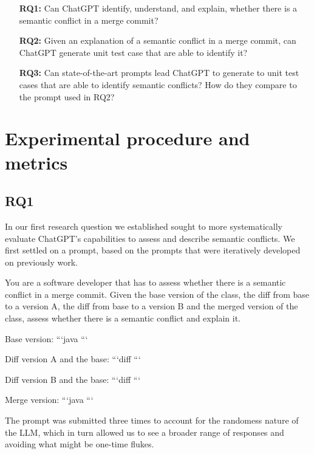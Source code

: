 \begin{itemize}
  \item[\textbf{RQ1:}] Can ChatGPT identify, understand, and explain, whether
  there is a semantic conflict in a merge commit?

  \item[\textbf{RQ2:}] Given an explanation of a semantic conflict in a merge
  commit, can ChatGPT generate unit test case that are able to identify it?

  \item[\textbf{RQ3:}] Can state-of-the-art prompts lead ChatGPT to generate to
  unit test cases that are able to identify semantic conflicts?  How do they
  compare to the prompt used in RQ2?
\end{itemize}

\section{Experimental procedure and metrics}

\subsection{RQ1}

In our first research question we established sought to more systematically evaluate ChatGPT's capabilities to assess and describe semantic conflicts.
We first settled on a prompt, based on the prompts that were iteratively developed on previously work.

\begin{prompt}
You are a software developer that has to assess whether there is a semantic conflict in a merge commit.  Given the base version of the class, the diff from base to a version A, the diff from base to a version B and the merged version of the class, assess whether there is a semantic conflict and explain it.

Base version:
```java
```

Diff version A and the base:
```diff
```

Diff version B and the base:
```diff
```

Merge version:
```java
```
\end{prompt}

The prompt was submitted three times to account for the randomess nature of the
LLM, which in turn allowed us to see a broader range of responses and avoiding
what might be one-time flukes.

